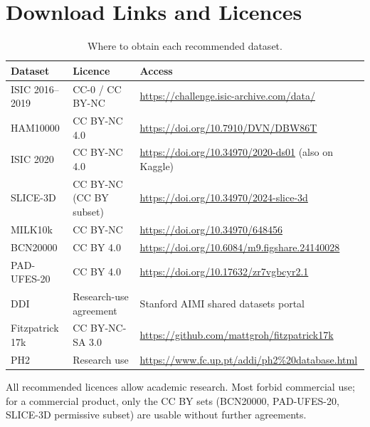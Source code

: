 \documentclass[10pt,a4paper]{article}
\begin{document}
\section{Download Links and Licences}
\begin{table}[H]
\centering
\caption{Where to obtain each recommended dataset.}
\renewcommand{\arraystretch}{1.25}
\small
\begin{tabularx}{\linewidth}{@{}L{2.6cm} L{2.6cm} Y@{}}
\toprule
\textbf{Dataset} & \textbf{Licence} & \textbf{Access} \\
\midrule
ISIC 2016--2019 & CC-0 / CC BY-NC & \url{https://challenge.isic-archive.com/data/} \\
HAM10000 & CC BY-NC 4.0 & \url{https://doi.org/10.7910/DVN/DBW86T} \\
ISIC 2020 & CC BY-NC 4.0 & \url{https://doi.org/10.34970/2020-ds01} (also on Kaggle) \\
SLICE-3D & CC BY-NC (CC BY subset) & \url{https://doi.org/10.34970/2024-slice-3d} \\
MILK10k & CC BY-NC & \url{https://doi.org/10.34970/648456} \\
BCN20000 & CC BY 4.0 & \url{https://doi.org/10.6084/m9.figshare.24140028} \\
PAD-UFES-20 & CC BY 4.0 & \url{https://doi.org/10.17632/zr7vgbcyr2.1} \\
DDI & Research-use agreement & Stanford AIMI shared datasets portal \\
Fitzpatrick 17k & CC BY-NC-SA 3.0 & \url{https://github.com/mattgroh/fitzpatrick17k} \\
PH2 & Research use & \url{https://www.fc.up.pt/addi/ph2\%20database.html} \\
\bottomrule
\end{tabularx}
\end{table}
All recommended licences allow academic research. Most forbid
commercial use; for a commercial product, only the CC BY sets
(BCN20000, PAD-UFES-20, SLICE-3D permissive subset) are usable without
further agreements.

\end{document}
